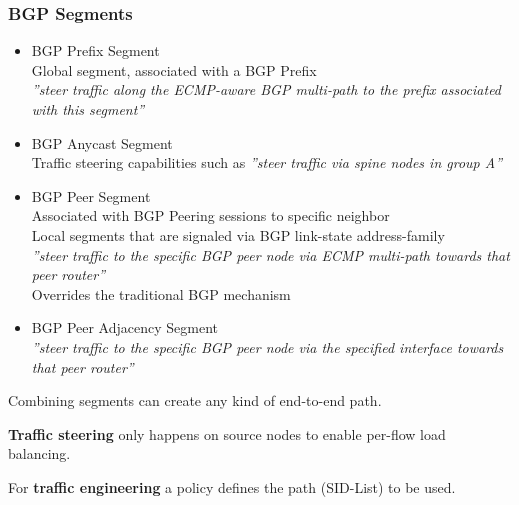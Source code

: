 \subsubsection{BGP Segments}
\begin{itemize}
    \item BGP Prefix Segment \\
    Global segment, associated with a BGP Prefix \\
    \emph{”steer traffic along the ECMP-aware BGP multi-path to the prefix associated with this segment”} 
    \item BGP Anycast Segment \\
    Traffic steering capabilities such as \emph{”steer traffic via spine nodes in group A”} 
    \item BGP Peer Segment \\
    Associated with BGP Peering sessions to specific neighbor \\ 
    Local segments that are signaled via BGP link-state address-family \\
    \emph{”steer traffic to the specific BGP peer node via ECMP multi-path towards that peer router”} \\
    Overrides the traditional BGP mechanism 
    \item BGP Peer Adjacency Segment \\
    \emph{”steer traffic to the specific BGP peer node via the specified interface towards that peer router”}
\end{itemize}

\noindent
Combining segments can create any kind of end-to-end path.

\noindent
\textbf{Traffic steering} only happens on source nodes to enable per-flow load balancing.

\noindent
For \textbf{traffic engineering} a policy defines the path (SID-List) to be used. 